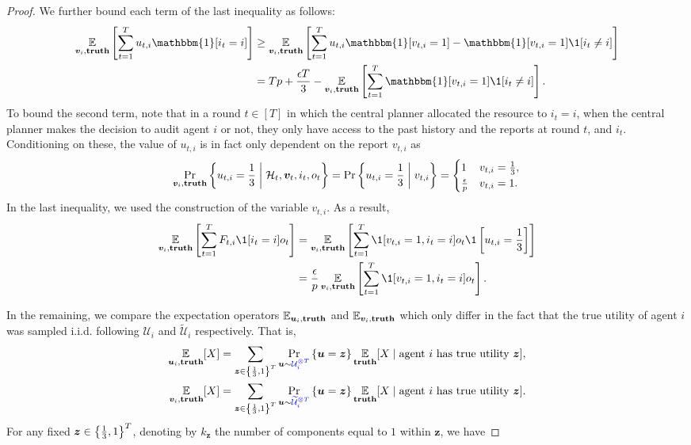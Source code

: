 \begin{proof}
    We further bound each term of the last inequality as follows:
    \begin{align}
        \E_{\bm v_i,\textbf{truth}} \sqb{\sum_{t=1}^T u_{t,i} \mathbbm{1}[i_t=i] } &\geq \E_{\bm v_i,\textbf{truth}} \sqb{\sum_{t=1}^T u_{t,i} \mathbbm{1}[v_{t,i}=1] - \mathbbm{1}[v_{t,i}=1]\1[i_t\neq i] } \notag \\
        &=Tp +\frac{\epsilon T}{3}  - \E_{\bm v_i,\textbf{truth}} \sqb{\sum_{t=1}^T  \mathbbm{1}[v_{t,i}=1]\1[i_t\neq i] }. \label{eq:bound_V_i_deviation_2}
    \end{align}
    To bound the second term, note that in a round $t\in[T]$ in which the central planner allocated the resource to $i_t=i$, when the central planner makes the decision to audit agent $i$ or not, they only have access to the past history and the reports at round $t$, and $i_t$. Conditioning on these, the value of $u_{t,i}$ is in fact only dependent on the report $v_{t,i}$ as
    \begin{equation*}
        \Pr_{\bm v_i,\textbf{truth}}\set{ u_{t,i}=\frac{1}{3} \middle \vert \mH_t,\bm v_t, i_t, o_t} = \Pr\set{ u_{t,i}=\frac{1}{3} \middle \vert  v_{t,i}} = \begin{cases}
            1 & v_{t,i}=\frac{1}{3},\\
            \frac{\epsilon}{p}  & v_{t,i}=1.
        \end{cases}
    \end{equation*}
    In the last inequality, we used the construction of the variable $v_{t,i}$. 
    As a result, 
    \begin{align}
         \E_{\bm v_i,\textbf{truth}}\sqb{\sum_{t=1}^T F_{t,i}\1[i_t=i]o_t} &= \E_{\bm v_i,\textbf{truth}}\sqb{\sum_{t=1}^T \1[v_{t,i}=1,i_t=i]o_t \1\sqb{u_{t,i}=\frac 13}} \notag \\
         &= \frac{\epsilon}{p} \E_{\bm v_i,\textbf{truth}}\sqb{\sum_{t=1}^T \1[v_{t,i}=1,i_t=i]o_t}. \label{eq:bounding_nb_checks_for_catch}
    \end{align}
    
    In the remaining, we compare the expectation operators $\E_{\bm u_i,\textbf{truth}}$ and $\E_{\bm v_i,\textbf{truth}}$ which only differ in the fact that the true utility of agent $i$ was sampled i.i.d. following $\mathcal U_i$ and $\tilde{\mathcal U}_i$ respectively. That is,
    \begin{align}
    \E_{\bm u_i,\textbf{truth}}[X] &= \sum_{\bm z\in\set{\frac{1}{3},1}^T} \Pr_{\bm u\sim {\color{blue}{\mathcal U}_i^{\otimes T}}} \set{\bm u = \bm z} \E_{\textbf{truth}}[X\mid \text{agent $i$ has true utility }\bm z], \nonumber \\
    \E_{\bm v_i,\textbf{truth}}[X] &= \sum_{\bm z\in\set{\frac{1}{3},1}^T} \Pr_{\bm u\sim {\color{blue}\tilde{\mathcal U}_i^{\otimes T}}} \set{\bm u = \bm z} \E_{\textbf{truth}}[X\mid \text{agent $i$ has true utility }\bm z].\label{eq:comparing_expectations}
    \end{align}
    For any fixed $\bm z \in \left\{ \frac 13,1 \right\}^T$, denoting by $k_{\bm z}$ the number of components equal to $1$ within $\bm z$, we have
    

\end{proof}
